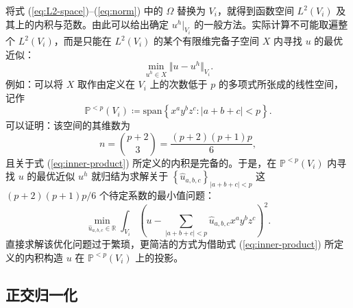 将式 (\ref{eq:L2-space})–(\ref{eq:norm}) 中的 $\varOmega$ 替换为 $V_{i}$，就得到函数空间
$L^{2}(V_{i})$ 及其上的内积与范数。由此可以给出确定
$u^{h}|_{V_{i}}$ 的一般方法。实际计算不可能取遍整个 $L^{2}(V_{i})$，而是只能在 $L^{2}(V_{i})$
的某个有限维完备子空间 $X$ 内寻找 $u$ 的最优近似：
\begin{equation}
\min_{u^{h}\in X}\Vert u-u^{h}\Vert_{V_{i}}.
\end{equation}
例如：可以将 $X$ 取作由定义在 $V_{i}$ 上的次数低于 $p$ 的多项式所张成的线性空间，记作
\begin{equation}
\mathbb{P}^{<p}(V_{i})\coloneqq\mathrm{span}\left\{ x^{a}y^{b}z^{c}:\vert a+b+c\vert<p\right\} .
\end{equation}
可以证明：该空间的其维数为
\begin{equation}
n=\binom{p+2}{3}=\frac{(p+2)(p+1)p}{6},
\end{equation}
且关于式 (\ref{eq:inner-product}) 所定义的内积是完备的。于是，在 $\mathbb{P}^{<p}(V_{i})$
内寻找 $u$ 的最优近似 $u^{h}$ 就归结为求解关于 $\left\{ \hat{u}_{a,b,c}\right\} _{\vert a+b+c\vert<p}$
这 $(p+2)(p+1)p/6$ 个待定系数的最小值问题：
\begin{equation}
\min_{\hat{u}_{a,b,c}\in\mathbb{R}}\int_{V_{i}}\left(u-\sum_{\vert a+b+c\vert<p}\hat{u}_{a,b,c}x^{a}y^{b}z^{c}\right)^{2}.
\end{equation}
直接求解该优化问题过于繁琐，更简洁的方式为借助式 (\ref{eq:inner-product}) 所定义的内积构造 $u$
在 $\mathbb{P}^{<p}(V_{i})$ 上的投影。

\subsection{正交归一化\label{subsec:orthonormal}}

